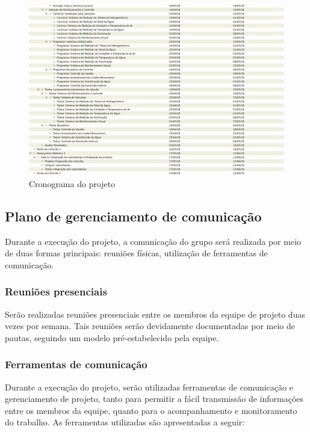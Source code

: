 \begin{figure}[H]
	\centering
	\includegraphics[width=16cm]{figuras/cronograma_3.png}
	\caption{Cronograma do projeto} \label{cronograma_2}
\end{figure}

\subsection{Plano de gerenciamento de comunicação}

Durante a execução do projeto, a comunicação do grupo será realizada por meio de duas formas principais: reuniões físicas, utilização de ferramentas de comunicação.

\subsubsection{Reuniões presenciais}

Serão realizadas reuniões presenciais entre os membros da equipe de projeto duas vezes por semana. Tais reuniões serão devidamente documentadas por meio de pautas, seguindo um modelo pré-estabelecido pela equipe.

\subsubsection{Ferramentas de comunicação}

Durante a execução do projeto, serão utilizadas ferramentas de comunicação e gerenciamento de projeto, tanto para permitir a fácil transmissão de informações entre os membros da equipe, quanto para o acompanhamento e monitoramento do trabalho. As ferramentas utilizadas são apresentadas a seguir:

